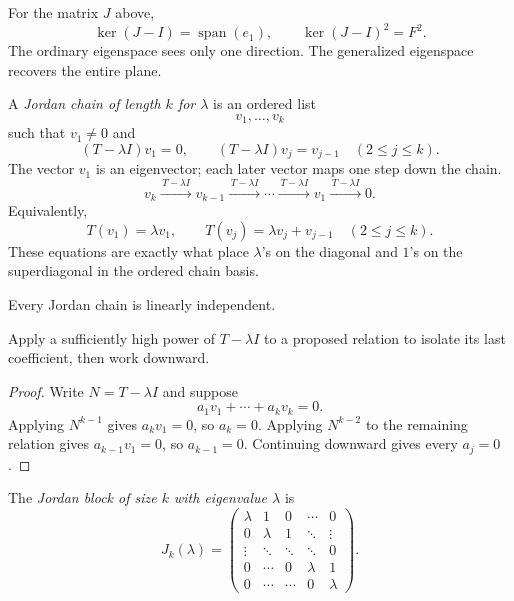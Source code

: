 \begin{example}
For the matrix \(J\) above,
\[
\ker(J-I)=\operatorname{span}(e_1),
\qquad
\ker(J-I)^2=F^2.
\]
The ordinary eigenspace sees only one direction.  The generalized eigenspace
recovers the entire plane.
\end{example}

\begin{definition}
A \emph{Jordan chain of length \(k\) for \(\lambda\)} is an ordered list
\[
v_1,\ldots,v_k
\]
such that \(v_1\ne0\) and
\[
(T-\lambda I)v_1=0,
\qquad
(T-\lambda I)v_j=v_{j-1}\quad(2\leq j\leq k).
\]
The vector \(v_1\) is an eigenvector; each later vector maps one step
down the chain.
\[
v_k\xrightarrow{\,T-\lambda I\,}v_{k-1}
\xrightarrow{\,T-\lambda I\,}\cdots
\xrightarrow{\,T-\lambda I\,}v_1
\xrightarrow{\,T-\lambda I\,}0.
\]
Equivalently,
\[
T(v_1)=\lambda v_1,\qquad
T(v_j)=\lambda v_j+v_{j-1}\quad(2\leq j\leq k).
\]
These equations are exactly what place \(\lambda\)'s on the diagonal and
\(1\)'s on the superdiagonal in the ordered chain basis.
\end{definition}

\begin{proposition}
Every Jordan chain is linearly independent.
\end{proposition}
\begin{proofidea}
Apply a sufficiently high power of \(T-\lambda I\) to a proposed relation
to isolate its last coefficient, then work downward.
\end{proofidea}
\begin{proof}
Write \(N=T-\lambda I\) and suppose
\[
a_1v_1+\cdots+a_kv_k=0.
\]
Applying \(N^{k-1}\) gives \(a_kv_1=0\), so \(a_k=0\).  Applying
\(N^{k-2}\) to the remaining relation gives \(a_{k-1}v_1=0\), so
\(a_{k-1}=0\).  Continuing downward gives every \(a_j=0\).
\end{proof}

\begin{definition}
The \emph{Jordan block of size \(k\) with eigenvalue \(\lambda\)} is
\[
J_k(\lambda)=
\begin{pmatrix}
\lambda&1&0&\cdots&0\\
0&\lambda&1&\ddots&\vdots\\
\vdots&\ddots&\ddots&\ddots&0\\
0&\cdots&0&\lambda&1\\
0&\cdots&\cdots&0&\lambda
\end{pmatrix}.
\]
\end{definition}

